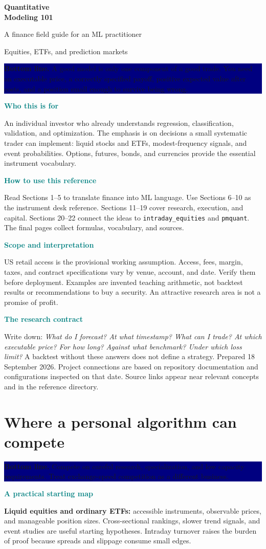 \documentclass[10pt,letterpaper]{article}
\newcommand{\bl}[1]{\noindent\colorbox{navy}{\parbox{\dimexpr\linewidth-2\fboxsep}{\color{white}\textbf{Bottom line.} #1}}\par\medskip}
\newcommand{\topic}[2]{\clearpage\section{#1}\bl{#2}}
\newcommand{\sub}[1]{\par\textbf{\textcolor{teal}{#1}}\par}
\begin{document}
\thispagestyle{empty}
{\Huge\bfseries\color{navy} Quantitative\\[6pt] Modeling 101}\par\bigskip
{\Large A finance field guide for an ML practitioner}\par
{\large Equities, ETFs, and prediction markets}\par\bigskip
\bl{A good model is only one component of a good trade. You need an executable price, a correctly specified payoff, positive expected value after costs, and a position small enough to survive being wrong.}
\sub{Who this is for}
An individual investor who already understands regression, classification, validation, and optimization. The emphasis is on decisions a small systematic trader can implement: liquid stocks and ETFs, modest-frequency signals, and event probabilities. Options, futures, bonds, and currencies provide the essential instrument vocabulary.
\sub{How to use this reference}
Read Sections 1--5 to translate finance into ML language. Use Sections 6--10 as the instrument desk reference. Sections 11--19 cover research, execution, and capital. Sections 20--22 connect the ideas to \texttt{intraday\_equities} and \texttt{pmquant}. The final pages collect formulas, vocabulary, and sources.
\sub{Scope and interpretation}
US retail access is the provisional working assumption. Access, fees, margin, taxes, and contract specifications vary by venue, account, and date. Verify them before deployment. Examples are invented teaching arithmetic, not backtest results or recommendations to buy a security. An attractive research area is not a promise of profit.
\sub{The research contract}
Write down: \emph{What do I forecast? At what timestamp? What can I trade? At which executable price? For how long? Against what benchmark? Under which loss limit?} A backtest without these answers does not define a strategy.
\vfill
{\small Prepared 18 September 2026. Project connections are based on repository documentation and configurations inspected on that date. Source links appear near relevant concepts and in the reference directory.}
\clearpage{\small\tableofcontents}
\topic{Where a personal algorithm can compete}{Compete on careful research, specialization, and low capacity requirements. Treat exchange-speed competition as a different business.}
\sub{A practical starting map}
\textbf{Liquid equities and ordinary ETFs:} accessible instruments, observable prices, and manageable position sizes. Cross-sectional rankings, slower trend signals, and event studies are useful starting hypotheses. Intraday turnover raises the burden of proof because spreads and slippage consume small edges.
\end{document}
